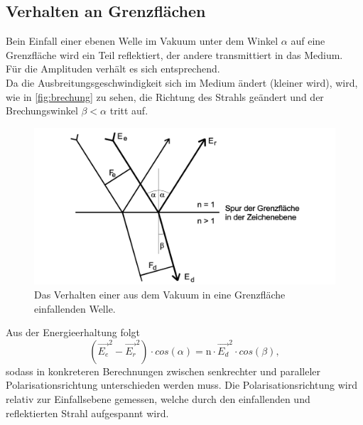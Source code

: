  \subsection{Verhalten an Grenzflächen}
Bein Einfall einer ebenen Welle im Vakuum unter dem Winkel $\alpha$ auf eine Grenzfläche 
wird ein Teil reflektiert, der andere transmittiert in das Medium. \\
Für die Amplituden verhält es sich entsprechend.\\
Da die Ausbreitungsgeschwindigkeit sich im Medium ändert (kleiner wird), wird, wie in \autoref{fig:brechung} zu sehen,  die 
Richtung des Strahls geändert und der Brechungswinkel $\beta < \alpha$ tritt auf.\\
\begin{figure} [H]
    \centering
    \includegraphics{content/brechung}
    \caption{Das Verhalten einer aus dem Vakuum in eine Grenzfläche einfallenden Welle. \cite{sample}}
    \label{fig:brechung}
  \end{figure}
Aus der Energieerhaltung folgt 
\begin{equation*}
    (\vec{E_e}^2 - \vec{E_r}^2)  \cdot cos(\alpha) =  \mathrm{n} \cdot \vec{E_d}^2 \cdot cos(\beta),
\end{equation*}
sodass in konkreteren Berechnungen zwischen senkrechter und paralleler Polarisationsrichtung 
unterschieden werden muss.
Die Polarisationsrichtung wird relativ zur Einfallsebene gemessen, welche durch den einfallenden 
und reflektierten Strahl aufgespannt wird. \\ 



